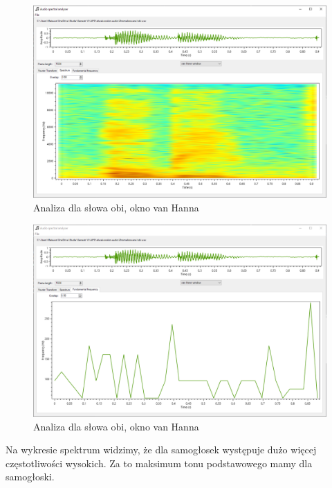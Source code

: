 \documentclass{article}
\begin{document}
\begin{figure}[H]
\includegraphics[width=6in]{scr12.png}
\centering
\caption{Analiza dla słowa obi, okno van Hanna}
\end{figure}

\begin{figure}[H]
\includegraphics[width=6in]{scr13.png}
\centering
\caption{Analiza dla słowa obi, okno van Hanna}
\end{figure}

Na wykresie spektrum widzimy, że dla samogłosek występuje dużo więcej częstotliwości wysokich. Za to maksimum tonu podstawowego mamy dla samogłoski.
\end{document}

